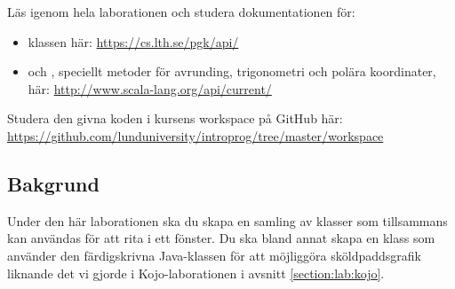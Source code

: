 

\Lab{\LabWeekFIVE}

\begin{Goals}

\end{Goals}

\begin{Preparations}
\item {}

\item Läs igenom hela laborationen och studera dokumentationen för:
\begin{itemize}[nolistsep,noitemsep]
\item klassen  här: \url{https://cs.lth.se/pgk/api/}

\item {} och , speciellt metoder för avrunding, trigonometri och polära koordinater, här:
\url{http://www.scala-lang.org/api/current/}
\end{itemize}

\item Studera den givna koden i kursens workspace på GitHub här:\\
\url{https://github.com/lunduniversity/introprog/tree/master/workspace}

\end{Preparations}

\subsection{Bakgrund}

Under den här laborationen ska du skapa en samling av klasser som tillsammans kan användas för att rita i ett fönster. Du ska bland annat skapa en klass  som använder den färdigskrivna Java-klassen  för att möjliggöra sköldpaddsgrafik liknande det vi gjorde i Kojo-laborationen i avsnitt \ref{section:lab:kojo}.


